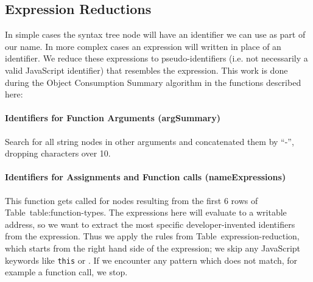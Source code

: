 \documentclass[10pt, preprint]{sigplanconf}
\begin{document}
{%



\subsection{Expression Reductions}
\label{sec:general-element-naming}

In simple cases the syntax tree node will have an identifier we can use as part of our name. In more complex cases an expression will written in place of an identifier. We reduce these expressions to pseudo-identifiers (i.e. not necessarily a valid JavaScript identifier) that resembles the expression. This work is done during the Object Consumption Summary algorithm in the functions described here:
\paragraph{Identifiers for Function Arguments (argSummary)} Search for all string nodes in other arguments and concatenated them by ``-'', dropping  characters over 10. 
\paragraph{Identifiers for Assignments and Function calls (nameExpressions)} This function gets called for nodes resulting from the first 6 rows of Table~{table:function-types}. The expressions here will evaluate to a writable address, so we want to extract the most specific developer-invented identifiers from the expression. Thus we apply the rules from Table~{expression-reduction}, which starts from the right hand side of the expression;  we skip any JavaScript keywords like \texttt{this} or . If we encounter any pattern which does not match, for example a function call, we stop. 

}
\end{document}
